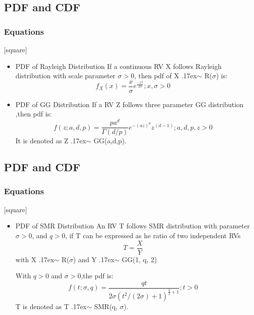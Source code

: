 \documentclass{beamer}
\begin{document}
\subsection*{PDF and CDF}
\begin{frame}[fragile]
\frametitle{Equations}
[square]
  \begin{itemize}
  \item PDF of Rayleigh Distribution
  \newline
  If a continuous RV X follows Rayleigh distribution with scale parameter $\sigma >0$, then pdf of X {\raise.17ex\hbox{$\scriptstyle\mathtt{\sim}$}} R($\sigma$) is:
  \begin{equation}
      f_X(x) = \frac{x}{\sigma} e^{\frac{-x^2}{2\sigma}}   ;x,\sigma>0
  \end{equation}
  
  \item PDF of GG Distribution
  \newline
  If a  RV Z follows three parameter GG distribution ,then pdf is:
  \begin{equation}
      f(z;a,d,p) = \frac{p a^d}{\Gamma(d/p)} e^{-(az)^p}z^{(d-1)}   ;a,d,p,z > 0
  \end{equation}
  \newline It is denoted as Z {\raise.17ex\hbox{$\scriptstyle\mathtt{\sim}$}} GG(a,d,p).
  
  \end{itemize}
\end{frame}

\subsection*{PDF and CDF}
\begin{frame}[fragile]
\frametitle{Equations}
[square]
  \begin{itemize}
  \item PDF of SMR Distribution
  \newline
  An RV T follows SMR distribution with parameter $\sigma >0$, and $q > 0$, if T can be expressed as he ratio of two independent RVs
  \begin{equation}
      T = \frac{X}{Y}
  \end{equation}
 with X {\raise.17ex\hbox{$\scriptstyle\mathtt{\sim}$}} R($\sigma$)  and Y {\raise.17ex\hbox{$\scriptstyle\mathtt{\sim}$}} GG(1, q, 2)
 \newline  
 
  \newline
  With $q>0$ and $\sigma>0$,the pdf is:
  \begin{equation}
      f(t;\sigma,q) = \frac{q t}{2\sigma (t^2/(2\sigma) + 1)^{\frac{q}{2}+1}}    ;t > 0
  \end{equation}
  \newline T is denoted as T {\raise.17ex\hbox{$\scriptstyle\mathtt{\sim}$}} SMR(q, $\sigma$).
  
  \end{itemize}
\end{frame}
\end{document}
